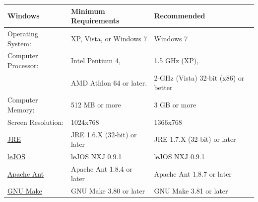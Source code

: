\documentclass[11pt, a4paper]{report}
\begin{document}
\begin{tabular}{| l | l | l | }
\hline
Windows					& Minimum Requirements									& Recommended				 			 	\\ \hline
Operating System:		& XP, Vista, or Windows 7								& Windows 7									\\ \hline
Computer Processor:		& Intel Pentium 4, 										& 1.5 GHz (XP), 							\\
						& AMD Athlon 64 or later.								& 2-GHz (Vista) 32-bit (x86) or better 		\\ \hline
Computer Memory:		& 512 MB or more										& 3 GB or more								\\ \hline
Screen Resolution:		& 1024x768												& 1366x768									\\ \hline
\href{http://www.oracle.com/technetwork/java/javase/downloads/index.html}{JRE}
						& JRE 1.6.X (32-bit) or later							& JRE 1.7.X (32-bit) or later				\\ \hline
\href{http://lejos.sourceforge.net}{leJOS}
	 					& leJOS NXJ 0.9.1										& leJOS NXJ 0.9.1							\\ \hline
\href{http://ant.apache.org}{Apache Ant}
		 				& Apache Ant 1.8.4 or later 							& Apache Ant 1.8.7 or later 				\\ \hline
\href{http://www.gnu.org/software/make/}{GNU Make}   				
						& GNU Make 3.80 or later 								& GNU Make 3.81 or later 					\\ \hline
\end{tabular}

\end{document}
